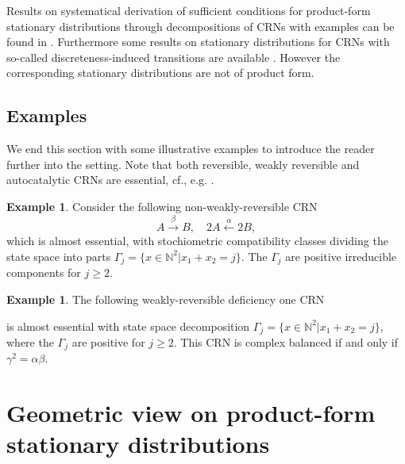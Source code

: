 \documentclass{amsart}
\theoremstyle{definition}
\newtheorem{example}[theorem]{Example}
\theoremstyle{remark}
\theoremstyle{Conjecture/open problem}
\theoremstyle{assumption}
\theoremstyle{conjecture}
\def\a{\alpha}
\def\be{\beta}
\def\Ga{\Gamma}
\def\N{\mathbb{N}}
\numberwithin{equation}{section}
\begin{document}
Results on systematical derivation of sufficient conditions for product-form stationary distributions through decompositions of CRNs with examples can be found in \cite{hoesslyuni}. Furthermore some results on stationary distributions for CRNs with so-called discreteness-induced transitions are available \cite{bibbona_stat}. However the corresponding stationary distributions are not of product form. 
 
\subsection{Examples}
We end this section with some illustrative examples to introduce the reader further into the setting. Note that both reversible, weakly reversible and autocatalytic CRNs are essential, cf., e.g. \cite{hoesslyuni}. 
  \begin{example}\label{ex1}
 Consider the following non-weakly-reversible CRN
 $$A\xrightarrow{\be} B,\quad 2A\xleftarrow{\a} 2B,$$
which is almost essential, with stochiometric compatibility classes dividing the state space into parts $\Ga_j=\{x\in \N^2| x_1+x_2=j\}$. The $\Ga_j$ are positive irreducible components for $j\geq2$.
 \end{example}
 
 \begin{example}\label{def1}
 The following weakly-reversible deficiency one CRN
\begin{center}
\end{center}


is almost essential with state space decomposition $\Ga_j=\{x\in \N^2| x_1+x_2=j\} $, where the $\Ga_j$ are positive for $j\geq2$. This CRN is complex balanced if and only if $\gamma^2=\a\be$.
 \end{example}


 
 
 
 
\section{Geometric view on product-form stationary distributions}\label{geom_v}
\end{document}

